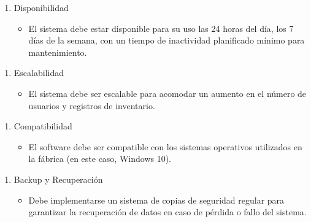 \documentclass{article}
\begin{document}
\begin{enumerate}[start=4]
	\item Disponibilidad
	\begin{itemize}
		\item El sistema debe estar disponible para su uso las 24 horas del día, los 7 días de la semana, con un tiempo de inactividad planificado mínimo para mantenimiento.
	\end{itemize}
\end{enumerate}

\begin{enumerate}[start=5]
	\item Escalabilidad
	\begin{itemize}
		\item El sistema debe ser escalable para acomodar un aumento en el número de usuarios y registros de inventario.
	\end{itemize}
\end{enumerate}

\begin{enumerate}[start=6]
	\item Compatibilidad
	\begin{itemize}
		\item El software debe ser compatible con los sistemas operativos utilizados en la fábrica (en este caso, Windows 10).
	\end{itemize}
\end{enumerate}

\begin{enumerate}[start=7]
	\item Backup y Recuperación
	\begin{itemize}
		\item Debe implementarse un sistema de copias de seguridad regular para garantizar la recuperación de datos en caso de pérdida o fallo del sistema.
	\end{itemize}
\end{enumerate}
\end{document}
